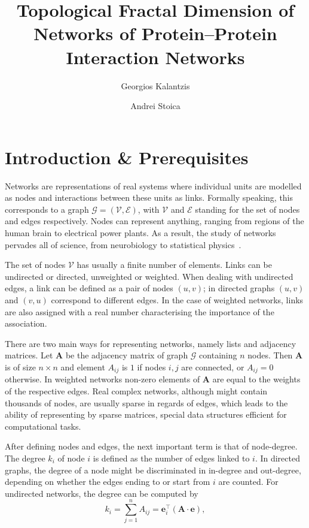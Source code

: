 \documentclass[10pt,twoside]{pnas-new}
\title{Topological  Fractal  Dimension  of  Networks  of Protein–Protein  Interaction  Networks}
\author{Georgios Kalantzis} %
\author{Andrei Stoica}
\affil{Systems  Approaches to Biomedical Science, Doctoral Training Centre, University of Oxford}
\begin{document}
\maketitle
\thispagestyle{firststyle}

\section{Introduction \& Prerequisites}
\label{SS:Intro}

Networks are representations of real systems where individual units are modelled as nodes and interactions between these units as links. Formally speaking, this corresponds to a graph $\mathcal{G} = (\mathcal{V},\mathcal{E})$, with $\mathcal{V}$ and $\mathcal{E}$ standing for the set of nodes and edges respectively. Nodes can represent anything, ranging from regions of the human brain to electrical power plants. As a result, the study of networks pervades all of science, from neurobiology to statistical physics~\cite{strogatz2001exploring}.  

The set of nodes $\mathcal{V}$ has usually a finite number of elements. Links can be undirected or directed, unweighted or weighted. When dealing with undirected edges, a link can be defined as a pair of nodes $(u,v)$; in directed graphs $(u,v)$ and $(v,u)$ correspond to different edges. In the case of weighted networks, links are also assigned with a real number characterising the importance of the association.

There are two main ways for representing networks, namely lists and adjacency matrices. Let $\mathbf{A}$ be the adjacency matrix of graph  $\mathcal{G}$ containing $n$ nodes. Then $\mathbf{A}$ is of size $n\times n$ and element $A_{ij}$ is $1$ if nodes $i,j$ are connected, or $A_{ij}=0$ otherwise. In weighted networks non-zero elements of $\mathbf{A}$ are equal to the weights of the respective edges. Real complex networks, although might contain thousands of nodes, are usually sparse in regards of edges, which leads to the ability of representing by sparse matrices, special data structures efficient for computational tasks.

After defining nodes and edges, the next important term is that of node-degree. The degree $k_i$ of node $i$ is defined as the number of edges linked to $i$. In directed graphs, the degree of a node might be discriminated in in-degree and out-degree, depending on whether the edges ending to or start from $i$ are counted. For undirected networks, the degree can be computed by
\begin{equation} 
	k_i = \sum_{j=1}^{n}A_{ij} = \mathbf{e}_i^\top ( \mathbf{A} \cdot \mathbf{e} ),
\end{equation}
\end{document}
